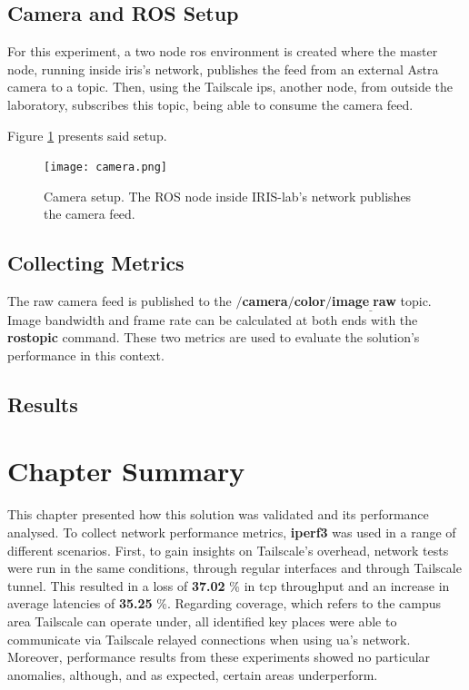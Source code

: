 \documentclass[11pt,twoside,a4paper]{report}
\begin{document}
\subsection{Camera and ROS Setup}

For this experiment, a two node \ac{ros} environment is created where the master node, running inside \ac{iris}'s network, publishes the feed from an external Astra camera to a topic. Then, using the Tailscale \acp{ip}, another node, from outside the laboratory, subscribes this topic, being able to consume the camera feed.

Figure \ref{fig:camera} presents said setup.


\begin{figure}[h]
\centering
  \texttt{[image: camera.png]}
  \caption{Camera setup. The ROS node inside IRIS-lab's network publishes the camera feed.}
  \label{fig:camera}
\end{figure}

\subsection{Collecting Metrics}

The raw camera feed is published to the \textbf{$/$camera$/$color$/$image$_\_$raw} topic. Image bandwidth and frame rate can be calculated at both ends with the \textbf{rostopic} command. These two metrics are used to evaluate the solution's performance in this context.

\subsection{Results}


\section{Chapter Summary}

This chapter presented how this solution was validated and its performance analysed. To collect network performance metrics, \textbf{iperf3} was used in a range of different scenarios. First, to gain insights on Tailscale's overhead, network tests were run in the same conditions, through regular interfaces and through Tailscale tunnel. This resulted in a loss of \textbf{37.02} \% in \ac{tcp} throughput and an increase in average latencies of \textbf{35.25} \%. Regarding coverage, which refers to the campus area Tailscale can operate under, all identified key places were able to communicate via Tailscale relayed connections when using \ac{ua}'s network. Moreover, performance results from these experiments showed no particular anomalies, although, and as expected, certain areas underperform.
\end{document}

